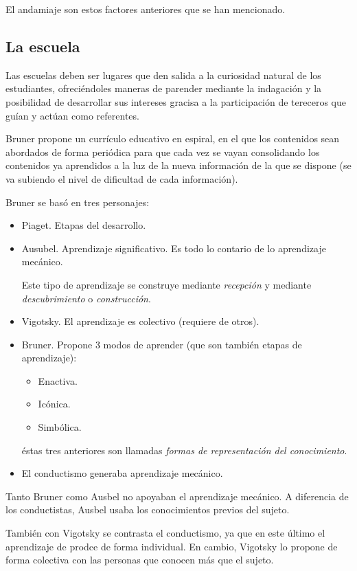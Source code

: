 \documentclass[12pt]{report}
\newcounter{it}
\theoremstyle{largebreak}
\begin{document}
    El andamiaje son estos factores anteriores que se han mencionado.

    \subsection{La escuela}

    Las escuelas deben ser lugares que den salida a la curiosidad natural de los estudiantes, ofreciéndoles maneras de parender mediante la indagación y la posibilidad de desarrollar sus intereses gracisa a la participación de tereceros que guían y actúan como referentes.

    Bruner propone un currículo educativo en espiral, en el que los contenidos sean abordados de forma periódica para que cada vez se vayan consolidando los contenidos ya aprendidos a la luz de la nueva información de la que se dispone (se va subiendo el nivel de dificultad de cada información).

    Bruner se basó en tres personajes:

    \begin{itemize}
        \item Piaget. Etapas del desarrollo.
        \item Ausubel. Aprendizaje significativo. Es todo lo contario de lo aprendizaje mecánico.
        
        Este tipo de aprendizaje se construye mediante \textit{recepción} y mediante \textit{descubrimiento} o \textit{construcción}.
        \item Vigotsky. El aprendizaje es colectivo (requiere de otros).
        \item Bruner. Propone 3 modos de aprender (que son también etapas de aprendizaje):
        \begin{itemize}
            \item Enactiva.
            \item Icónica.
            \item Simbólica.
        \end{itemize}
        éstas tres anteriores son llamadas \textit{formas de representación del conocimiento}.
        \item El conductismo generaba aprendizaje mecánico.
    \end{itemize}

    Tanto Bruner como Ausbel no apoyaban el aprendizaje mecánico. A diferencia de los conductistas, Ausbel usaba los conocimientos previos del sujeto.

    También con Vigotsky se contrasta el conductismo, ya que en este último el aprendizaje de prodce de forma individual. En cambio, Vigotsky lo propone de forma colectiva con las personas que conocen más que el sujeto.
\end{document}
